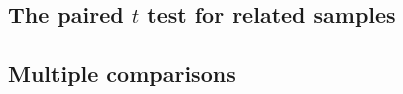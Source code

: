 \documentclass[t]{beamer} %
\begin{document}
\subsection{The paired $t$ test for related samples}

\begin{frame}
  \frametitle{}

\end{frame}

\begin{frame}[fragile]
  \frametitle{}

  \begin{alltt}
  \end{alltt}
\end{frame}

\subsection{Multiple comparisons}

\begin{frame}
  \frametitle{}

\end{frame}

\begin{frame}[fragile]
  \frametitle{}

  \begin{alltt}
  \end{alltt}
\end{frame}

\section{}

\subsection{}

\begin{frame}
  \frametitle{}

\end{frame}

\begin{frame}[fragile]
  \frametitle{}

  \begin{alltt}
  \end{alltt}
\end{frame}


\end{document}

